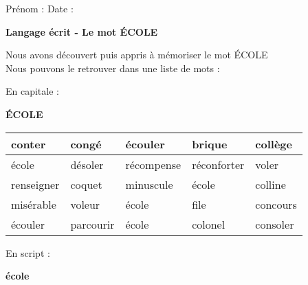 \documentclass[a4paper, 11pt]{article}
\begin{document}
\sloppy
\pagestyle{empty}
\begin{onehalfspace}

\sffamily 
\noindent \Large Prénom : \fbox{
    \begin{minipage}{9cm}
        \vspace{1.2cm} \hspace{9cm}
    \end{minipage}
} \hspace{1.5cm}\Large Date : \vspace{2mm}\\
\begin{minipage}{12cm}
    \begin{center}
    \Large \bfseries Langage écrit - Le mot \MakeUppercase{
        école
    }
    \end{center}
    \normalsize Nous avons découvert puis appris à mémoriser le mot \MakeUppercase{
        école
    }\\
    Nous pouvons le retrouver dans une liste de mots :
\end{minipage}

\vspace{0.25cm} 

{\large
\noindent En capitale :

\begin{center}
    {\huge \bfseries \MakeUppercase{
        école
    }}
    \vspace{0.25cm}\\
    \begin{tabulary}{17cm}{|g|g|g|g|g|}
    \hline

    conter & congé & écouler & brique & collège\\\hline
école & désoler & récompense & réconforter & voler\\\hline
renseigner & coquet & minuscule & école & colline\\\hline
misérable & voleur & école & file & concours\\\hline
écouler & parcourir & école & colonel & consoler\\\hline


    \end{tabulary}
\end{center}
}
\vspace{0.5cm}

{\large
\noindent En script :

\begin{center}
    {\huge \bfseries
        école
    }
    \vspace{0.25cm}\\
    \begin{tabulary}{17cm}{|h|h|h|h|h|}
    \hline


\end{tabulary}
\end{center}}
\end{onehalfspace}
\end{document}
